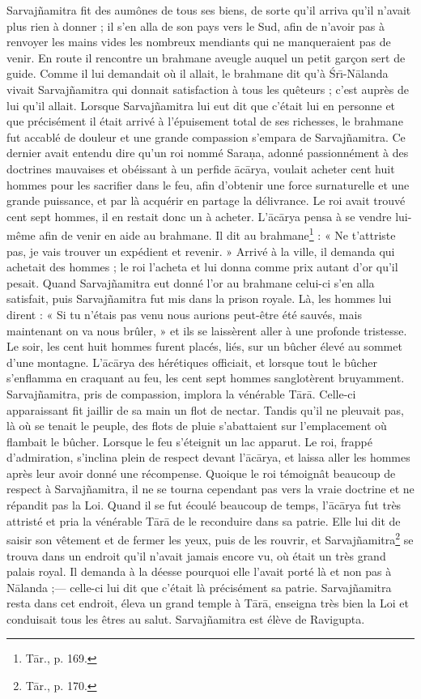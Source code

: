 \documentclass[a4paper, 11pt, oneside, french, landscape, twocolumn]{article}
\begin{document}
Sarvaj\~{n}amitra fit des aumônes de tous ses biens, de sorte qu'il arriva qu'il n'avait plus rien à donner ; il s'en alla de son pays vers le Sud, afin de n'avoir pas à renvoyer les mains vides les nombreux mendiants qui ne manqueraient pas de venir. En route il rencontre un brahmane aveugle auquel un petit garçon sert de guide. Comme il lui demandait où il allait, le brahmane dit qu'à \'{S}r\={\i}-N\={a}landa vivait Sarvaj\~{n}amitra qui donnait satisfaction à tous les quêteurs ; c'est auprès de lui qu'il allait. Lorsque Sarvaj\~{n}amitra lui eut dit que c'était lui en personne et que précisément il était arrivé à l'épuisement total de ses richesses, le brahmane fut accablé de douleur et une grande compassion s'empara de Sarvaj\~{n}amitra. Ce dernier avait entendu dire qu'un roi nommé Sara\d{n}a, adonné passionnément à des doctrines mauvaises et obéissant à un perfide \={a}c\={a}rya, voulait acheter cent huit hommes pour les sacrifier dans le feu, afin d'obtenir une force surnaturelle et une grande puissance, et par là acquérir en partage la délivrance. Le roi avait trouvé cent sept hommes, il en restait donc un à acheter. L'\={a}c\={a}rya pensa à se vendre lui-même afin de venir en aide au brahmane. Il dit au brahmane\footnote{T\={a}r., p. 169.} : « Ne t'attriste pas, je vais trouver un expédient et revenir. » Arrivé à la ville, il demanda qui achetait des hommes ; le roi l'acheta et lui donna comme prix autant d'or qu'il pesait. Quand Sarvaj\~{n}amitra eut donné l'or au brahmane celui-ci s'en alla satisfait, puis Sarvaj\~{n}amitra fut mis dans la prison royale. Là, les hommes lui dirent : « Si tu n'étais pas venu nous aurions peut-être été sauvés, mais maintenant on va nous brûler, » et ils se laissèrent aller à une profonde tristesse. Le soir, les cent huit hommes furent placés, liés, sur un bûcher élevé au sommet d'une montagne. L'\={a}c\={a}rya des hérétiques officiait, et lorsque tout le bûcher s'enflamma en craquant au feu, les cent sept hommes sanglotèrent bruyamment. Sarvaj\~{n}amitra, pris de compassion, implora la vénérable T\={a}r\={a}. Celle-ci apparaissant fit jaillir de sa main un flot de nectar. Tandis qu'il ne pleuvait pas, là où se tenait le peuple, des flots de pluie s'abattaient sur l'emplacement où flambait le bûcher. Lorsque le feu s'éteignit un lac apparut. Le roi, frappé d'admiration, s'inclina plein de respect devant l'\={a}c\={a}rya, et laissa aller les hommes après leur avoir donné une récompense. Quoique le roi témoignât beaucoup de respect à Sarvaj\~{n}amitra, il ne se tourna cependant pas vers la vraie doctrine et ne répandit pas la Loi. Quand il se fut écoulé beaucoup de temps, l'\={a}c\={a}rya fut très attristé et pria la vénérable T\={a}r\={a} de le reconduire dans sa patrie. Elle lui dit de saisir son vêtement et de fermer les yeux, puis de les rouvrir, et Sarvaj\~{n}amitra\footnote{T\={a}r., p. 170.} se trouva dans un endroit qu'il n'avait jamais encore vu, où était un très grand palais royal. Il demanda à la déesse pourquoi elle l'avait porté là et non pas à N\={a}landa ;--- celle-ci lui dit que c'était là précisément sa patrie. Sarvaj\~{n}amitra resta dans cet endroit, éleva un grand temple à T\={a}r\={a}, enseigna très bien la Loi et conduisait tous les êtres au salut. Sarvaj\~{n}amitra est élève de Ravigupta.
\end{document}
